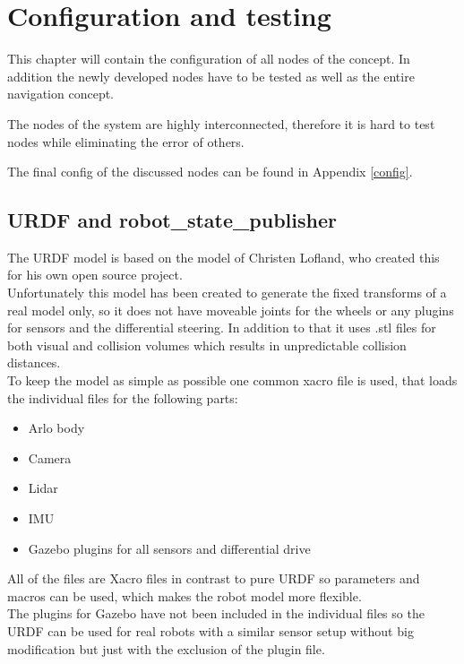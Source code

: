 \chapter{Configuration and testing}
\label{configurationandtesting}

This chapter will contain the configuration of all nodes of the concept. In addition the newly developed nodes have to be tested as well as the entire navigation concept.

The nodes of the system are highly interconnected, therefore it is hard to test nodes while eliminating the error of others.

The final config of the discussed nodes can be found in Appendix \ref{config}.

\section{URDF and robot\_state\_publisher}

The URDF model is based on the model of Christen Lofland, who created this for his own open source project\cite{chrisl8}.\\

Unfortunately this model has been created to generate the fixed transforms of a real model only, so it does not have moveable joints for the wheels or any plugins for sensors and the differential steering. In addition to that it uses .stl files for both visual and collision volumes which results in unpredictable collision distances.\\

To keep the model as simple as possible one common xacro file is used, that loads the individual files for the following parts:
\begin{itemize}
	\item Arlo body
	\item Camera
	\item Lidar
	\item IMU
	\item Gazebo plugins for all sensors and differential drive
\end{itemize}

All of the files are Xacro files in contrast to pure URDF so parameters and macros can be used, which makes the robot model more flexible.\\

The plugins for Gazebo have not been included in the individual files so the URDF can be used for real robots with a similar sensor setup without big modification but just with the exclusion of the plugin file.

